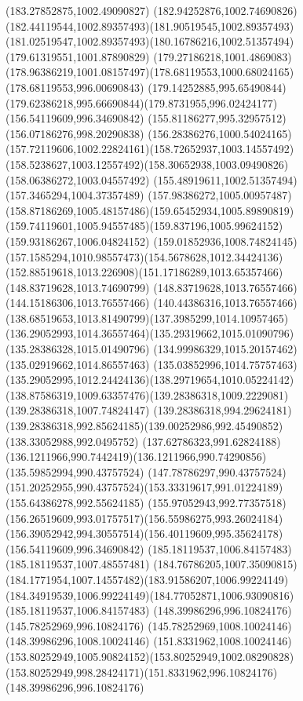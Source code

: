 {{		\lineto(183.27852875,1002.49090827)
		\curveto(182.94252876,1002.74690826)(182.44119544,1002.89357493)(181.90519545,1002.89357493)
		\curveto(181.02519547,1002.89357493)(180.16786216,1002.51357494)(179.61319551,1001.87890829)
		\curveto(179.27186218,1001.4869083)(178.96386219,1001.08157497)(178.68119553,1000.68024165)
		\lineto(178.68119553,996.00690843)
		\curveto(179.14252885,995.65490844)(179.62386218,995.66690844)(179.8731955,996.02424177)
		\moveto(156.54119609,996.34690842)
		\lineto(155.81186277,995.32957512)
		\lineto(156.07186276,998.20290838)
		\curveto(156.28386276,1000.54024165)(157.72119606,1002.22824161)(158.72652937,1003.14557492)
		\curveto(158.5238627,1003.12557492)(158.30652938,1003.09490826)(158.06386272,1003.04557492)
		\lineto(155.48919611,1002.51357494)
		\lineto(157.3465294,1004.37357489)
		\curveto(157.98386272,1005.00957487)(158.87186269,1005.48157486)(159.65452934,1005.89890819)
		\curveto(159.74119601,1005.94557485)(159.837196,1005.99624152)(159.93186267,1006.04824152)
		\curveto(159.01852936,1008.74824145)(157.1585294,1010.98557473)(154.5678628,1012.34424136)
		\curveto(152.88519618,1013.226908)(151.17186289,1013.65357466)(148.83719628,1013.74690799)
		\lineto(148.83719628,1013.76557466)
		\lineto(144.15186306,1013.76557466)
		\curveto(140.44386316,1013.76557466)(138.68519653,1013.81490799)(137.3985299,1014.10957465)
		\curveto(136.29052993,1014.36557464)(135.29319662,1015.01090796)(135.28386328,1015.01490796)
		\lineto(134.99986329,1015.20157462)
		\lineto(135.02919662,1014.86557463)
		\curveto(135.03852996,1014.75757463)(135.29052995,1012.24424136)(138.29719654,1010.05224142)
		\curveto(138.87586319,1009.63357476)(139.28386318,1009.2229081)(139.28386318,1007.74824147)
		\lineto(139.28386318,994.29624181)
		\curveto(139.28386318,992.85624185)(139.00252986,992.45490852)(138.33052988,992.0495752)
		\curveto(137.62786323,991.62824188)(136.1211966,990.7442419)(136.1211966,990.74290856)
		\lineto(135.59852994,990.43757524)
		\lineto(147.78786297,990.43757524)
		\curveto(151.20252955,990.43757524)(153.33319617,991.01224189)(155.64386278,992.55624185)
		\curveto(155.97052943,992.77357518)(156.26519609,993.01757517)(156.55986275,993.26024184)
		\curveto(156.39052942,994.30557514)(156.40119609,995.35624178)(156.54119609,996.34690842)
		\moveto(185.18119537,1006.84157483)
		\lineto(185.18119537,1007.48557481)
		\curveto(184.76786205,1007.35090815)(184.1771954,1007.14557482)(183.91586207,1006.99224149)
		\curveto(184.34919539,1006.99224149)(184.77052871,1006.93090816)(185.18119537,1006.84157483)
		\moveto(148.39986296,996.10824176)
		\lineto(145.78252969,996.10824176)
		\lineto(145.78252969,1008.10024146)
		\lineto(148.39986296,1008.10024146)
		\curveto(151.8331962,1008.10024146)(153.80252949,1005.90824152)(153.80252949,1002.08290828)
		\curveto(153.80252949,998.28424171)(151.8331962,996.10824176)(148.39986296,996.10824176)
	}
}
